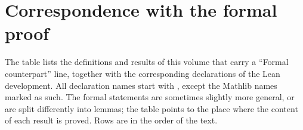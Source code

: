 \chapter{Correspondence with the formal proof}\label{app:formal}

The table lists the definitions and results of this volume that carry a ``Formal counterpart''
line, together with the corresponding declarations of the Lean development. All declaration
names start with , except the Mathlib names marked as such. The formal statements are
sometimes slightly more general, or are split differently into lemmas; the table points to the
place where the content of each result is proved. Rows are in the order of the text.

